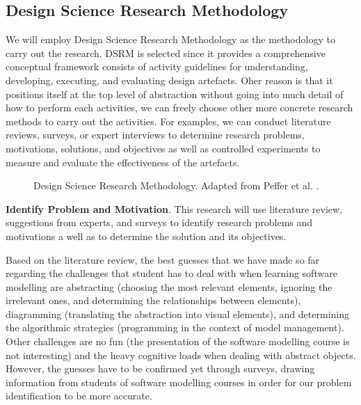 \documentclass[12pt, a4paper]{report}
\begin{document}
\subsection{Design Science Research Methodology}
We will employ Design Science Research Methodology \cite{peffers2007design} as the methodology to carry out the research. DSRM is selected since it provides a comprehensive conceptual framework consists of activity guidelines for understanding, developing, executing, and evaluating design artefacts. Oher reason is that it positions itself at the top level of abstraction without going into much detail of how to perform each activities, we can freely choose other more concrete research methods to carry out the activities. For examples, we can conduct literature reviews, surveys, or expert interviews to determine research problems, motivations, solutions, and objectives as well as controlled experiments to measure and evaluate the effectiveness of the artefacts. 

\begin{figure}[ht]
\centering
{}
\caption{Design Science Research Methodology. Adapted from Peffer et al. \cite{peffers2007design}.}
\label{fig:003}
\end{figure}

\textbf{Identify Problem and Motivation}. This research will use literature review, suggestions from experts, and surveys to identify research problems and motivations a well as to determine the solution and its objectives.

Based on the literature review, the best guesses that we have made so far regarding the challenges that student has to deal with when learning software modelling are abstracting (choosing the most relevant elements, ignoring the irrelevant ones, and determining the relationships between elements), diagramming (translating the abstraction into visual elements), and determining the algorithmic strategies (programming in the context of model management). Other challenges are no fun (the presentation of the software modelling course is not interesting) and the heavy cognitive loads when dealing with abstract objects. However, the guesses have to be confirmed yet through surveys, drawing information from students of software modelling courses in order for our problem identification to be more accurate.
\end{document}
